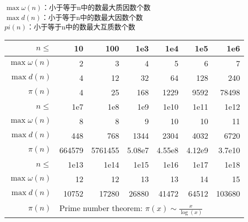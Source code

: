 \begin{center}
    $\max\omega(n)$：小于等于n中的数最大质因数个数\\
    $\max d(n)$：小于等于n中的数最大因数个数\\
    $pi(n)$：小于等于n中的数最大互质数个数\\
    \begin{tabular}{|r|r|r|r|r|r|r|}  
        \hline
        \rowcolor{gray!20}
        $n\leq$         & 10        & 100       & 1e3       & 1e4       & 1e5       & 1e6           \\ \hline  
        $\max\omega(n)$ & 2         & 3         & 4         & 5         & 6         & 7             \\ \hline 
        $\max d(n)$     & 4         & 12        & 32        & 64        & 128       & 240           \\ \hline 
        $\pi(n)$        & 4         & 25        & 168       & 1229      & 9592      & 78498         \\ \hline 
        \rowcolor{gray!20}
        $n\leq$         & 1e7       & 1e8       & 1e9       & 1e10      & 1e11      & 1e12          \\ \hline 
        $\max\omega(n)$ & 8         & 8         & 9         & 10        & 10        & 11            \\ \hline 
        $\max d(n)$     & 448       & 768       & 1344      & 2304      & 4032      & 6720          \\ \hline 
        $\pi(n)$        & 664579    & 5761455   & 5.08e7    & 4.55e8    & 4.12e9    & 3.7e10        \\ \hline 
        \rowcolor{gray!20}
        $n\leq$         & 1e13      & 1e14      & 1e15      & 1e16      & 1e17      & 1e18          \\ \hline 
        $\max\omega(n)$ & 12        & 12        & 13        & 13        & 14        & 15            \\ \hline 
        $\max d(n)$     & 10752     & 17280     & 26880     & 41472     & 64512     & 103680        \\ \hline 
        $\pi(n)$        & \multicolumn{5}{l}{Prime number theorem: $\pi(x) \sim \frac{x}{\log(x)}$}&\\ \hline 
    \end{tabular}
\end{center}